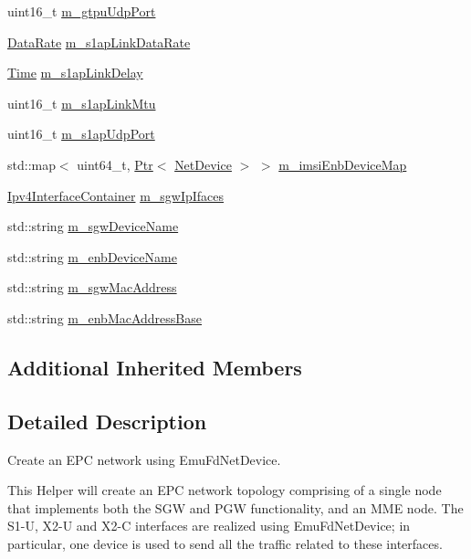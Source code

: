 \begin{DoxyCompactItemize}
uint16\+\_\+t \hyperlink{classns3_1_1EmuEpcHelper_a99fe0fcbc0bd3668f30cf6ae53377a22}{m\+\_\+gtpu\+Udp\+Port}
\item 
\hyperlink{classns3_1_1DataRate}{Data\+Rate} \hyperlink{classns3_1_1EmuEpcHelper_ac0b5058393492c89ecacfe6324cdef69}{m\+\_\+s1ap\+Link\+Data\+Rate}
\item 
\hyperlink{classns3_1_1Time}{Time} \hyperlink{classns3_1_1EmuEpcHelper_a9e719fe27e97da61af652e8fe47640b6}{m\+\_\+s1ap\+Link\+Delay}
\item 
uint16\+\_\+t \hyperlink{classns3_1_1EmuEpcHelper_a8ed5f99d60bfe51d3dac00c2ab445a17}{m\+\_\+s1ap\+Link\+Mtu}
\item 
uint16\+\_\+t \hyperlink{classns3_1_1EmuEpcHelper_a40b9bb46dee69ea02ffe0722b462db8e}{m\+\_\+s1ap\+Udp\+Port}
\item 
std\+::map$<$ uint64\+\_\+t, \hyperlink{classns3_1_1Ptr}{Ptr}$<$ \hyperlink{classns3_1_1NetDevice}{Net\+Device} $>$ $>$ \hyperlink{classns3_1_1EmuEpcHelper_ac7fabf537680e203fa2456bc1854e764}{m\+\_\+imsi\+Enb\+Device\+Map}
\item 
\hyperlink{classns3_1_1Ipv4InterfaceContainer}{Ipv4\+Interface\+Container} \hyperlink{classns3_1_1EmuEpcHelper_aec4d868be3d7593b66f0e87fc59055f1}{m\+\_\+sgw\+Ip\+Ifaces}
\item 
std\+::string \hyperlink{classns3_1_1EmuEpcHelper_aaf7c6410b27ea82a8fabc136801bf0d4}{m\+\_\+sgw\+Device\+Name}
\item 
std\+::string \hyperlink{classns3_1_1EmuEpcHelper_a6bd1148381a5fb8d14a20673b4d50420}{m\+\_\+enb\+Device\+Name}
\item 
std\+::string \hyperlink{classns3_1_1EmuEpcHelper_abb2f5dec50c8361cb99e11c9c688bf5c}{m\+\_\+sgw\+Mac\+Address}
\item 
std\+::string \hyperlink{classns3_1_1EmuEpcHelper_a5958f60d6b9a984edace5ee351188e39}{m\+\_\+enb\+Mac\+Address\+Base}
\end{DoxyCompactItemize}
\subsection*{Additional Inherited Members}


\subsection{Detailed Description}
Create an E\+PC network using Emu\+Fd\+Net\+Device. 

This Helper will create an E\+PC network topology comprising of a single node that implements both the S\+GW and P\+GW functionality, and an M\+ME node. The S1-\/U, X2-\/U and X2-\/C interfaces are realized using Emu\+Fd\+Net\+Device; in particular, one device is used to send all the traffic related to these interfaces. 

